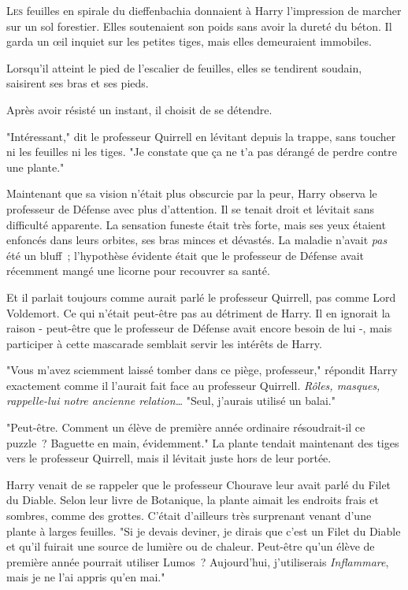 
\lettrine{L}{es} feuilles en spirale du dieffenbachia donnaient à Harry l'impression de marcher sur un sol forestier. Elles soutenaient son poids sans avoir la dureté du béton. Il garda un œil inquiet sur les petites tiges, mais elles demeuraient immobiles.

Lorsqu'il atteint le pied de l'escalier de feuilles, elles se tendirent soudain, saisirent ses bras et ses pieds.

Après avoir résisté un instant, il choisit de se détendre.

"Intéressant," dit le professeur Quirrell en lévitant depuis la trappe, sans toucher ni les feuilles ni les tiges. "Je constate que ça ne t'a pas dérangé de perdre contre une plante."

Maintenant que sa vision n'était plus obscurcie par la peur, Harry observa le professeur de Défense avec plus d'attention. Il se tenait droit et lévitait sans difficulté apparente. La sensation funeste était très forte, mais ses yeux étaient enfoncés dans leurs orbites, ses bras minces et dévastés. La maladie n'avait \emph{pas} été un bluff~; l'hypothèse évidente était que le professeur de Défense avait récemment mangé une licorne pour recouvrer sa santé.

Et il parlait toujours comme aurait parlé le professeur Quirrell, pas comme Lord Voldemort. Ce qui n'était peut-être pas au détriment de Harry. Il en ignorait la raison - peut-être que le professeur de Défense avait encore besoin de lui -, mais participer à cette mascarade semblait servir les intérêts de Harry.

"Vous m'avez sciemment laissé tomber dans ce piège, professeur," répondit Harry exactement comme il l'aurait fait face au professeur Quirrell. \emph{Rôles, masques, rappelle-lui notre ancienne relation…} "Seul, j'aurais utilisé un balai."

"Peut-être. Comment un élève de première année ordinaire résoudrait-il ce puzzle~? Baguette en main, évidemment." La plante tendait maintenant des tiges vers le professeur Quirrell, mais il lévitait juste hors de leur portée.

Harry venait de se rappeler que le professeur Chourave leur avait parlé du Filet du Diable. Selon leur livre de Botanique, la plante aimait les endroits frais et sombres, comme des grottes. C'était d'ailleurs très surprenant venant d'une plante à larges feuilles. "Si je devais deviner, je dirais que c'est un Filet du Diable et qu'il fuirait une source de lumière ou de chaleur. Peut-être qu'un élève de première année pourrait utiliser Lumos~? Aujourd'hui, j'utiliserais \emph{Inflammare}, mais je ne l'ai appris qu'en mai."

